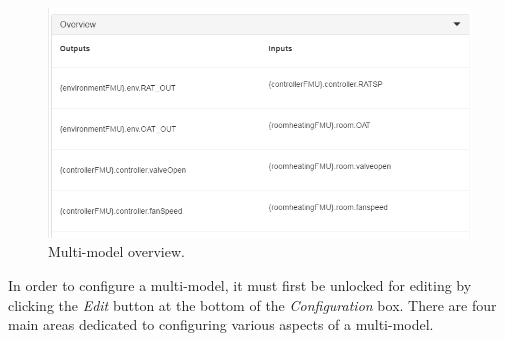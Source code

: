 %
%
%
\begin{figure}[h!]
\centering
\includegraphics[width=\textwidth]{./figures/app/mm-overview}
\caption{Multi-model overview.}
\label{fig:mm-overview}
\end{figure}
%
%
%
In order to configure a multi-model, it must first be unlocked for editing
by clicking the \textit{Edit} button at the bottom of the \textit{Configuration}
box. There are four main areas dedicated to configuring various aspects of a multi-model.

